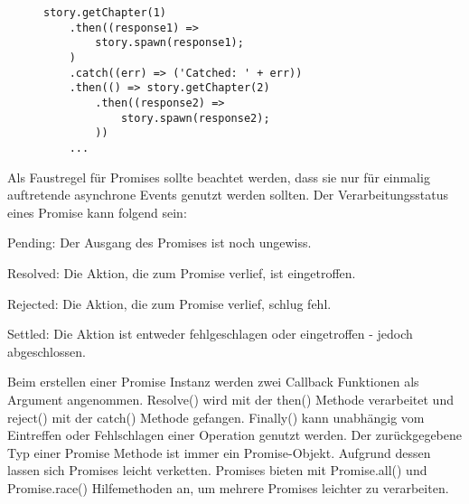 \begin{figure}[H]
\begin{lstlisting}[basicstyle=\small]
story.getChapter(1)
    .then((response1) =>
        story.spawn(response1);
    )
    .catch((err) => ('Catched: ' + err))
    .then(() => story.getChapter(2)
        .then((response2) => 
            story.spawn(response2);
        ))
    ...
    \end{lstlisting}
\end{figure}

\noindent
Als Faustregel für Promises sollte beachtet werden, dass sie nur für einmalig auftretende asynchrone Events genutzt werden sollten. Der Verarbeitungsstatus eines Promise kann folgend sein:

\begin{description} 
\item Pending: Der Ausgang des Promises ist noch ungewiss.
\item Resolved: Die Aktion, die zum Promise verlief, ist eingetroffen.
\item Rejected: Die Aktion, die zum Promise verlief, schlug fehl.
\item Settled: Die Aktion ist entweder fehlgeschlagen oder eingetroffen - jedoch abgeschlossen.
\end{description}

\noindent
Beim erstellen einer Promise Instanz werden zwei Callback Funktionen als Argument angenommen. Resolve() wird mit der then() Methode verarbeitet und reject() mit der catch() Methode gefangen. Finally() kann unabhängig vom Eintreffen oder Fehlschlagen einer Operation genutzt werden. Der zurückgegebene Typ einer Promise Methode ist immer ein Promise-Objekt. Aufgrund dessen lassen sich Promises leicht verketten. Promises bieten mit Promise.all() und Promise.race() Hilfemethoden an, um mehrere Promises leichter zu verarbeiten.




